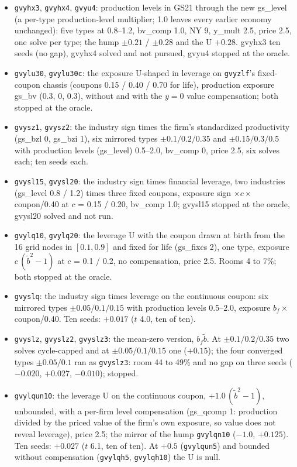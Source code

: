 \documentclass[11pt]{article}
\begin{document}
\begin{itemize}
\item \texttt{gvyhx3}, \texttt{gvyhx4}, \texttt{gvyu4}: production levels in GS21 through the new gs\_level (a per-type production-level multiplier; 1.0 leaves every earlier economy unchanged): five types at 0.8--1.2, bv\_comp 1.0, NY 9, y\_mult 2.5, price 2.5, one solve per type; the hump $\pm0.21$ / $\pm0.28$ and the U $+0.28$. gvyhx3 ten seeds (no gap), gvyhx4 solved and not pursued, gvyu4 stopped at the oracle.
\item \texttt{gvylu30}, \texttt{gvylu30c}: the exposure U-shaped in leverage on \texttt{gvyzlf}'s fixed-coupon chassis (coupons 0.15 / 0.40 / 0.70 for life), production exposure gs\_bv (0.3, 0, 0.3), without and with the $y = 0$ value compensation; both stopped at the oracle.
\item \texttt{gvysz1}, \texttt{gvysz2}: the industry sign times the firm's standardized productivity (gs\_bzl 0, gs\_bzi 1), six mirrored types $\pm0.1/0.2/0.35$ and $\pm0.15/0.3/0.5$ with production levels (gs\_level) 0.5--2.0, bv\_comp 0, price 2.5, six solves each; ten seeds each.
\item \texttt{gvysl15}, \texttt{gvysl20}: the industry sign times financial leverage, two industries (gs\_level 0.8 / 1.2) times three fixed coupons, exposure sign $\times c \times$ coupon/0.40 at $c$ = 0.15 / 0.20, bv\_comp 1.0; gvysl15 stopped at the oracle, gvysl20 solved and not run.
\item \texttt{gvylq10}, \texttt{gvylq20}: the leverage U with the coupon drawn at birth from the 16 grid nodes in $[0.1, 0.9]$ and fixed for life (gs\_fixcs 2), one type, exposure $c\,(\tilde b^2 - 1)$ at $c$ = 0.1 / 0.2, no compensation, price 2.5. Rooms 4 to 7\%; both stopped at the oracle.
\item \texttt{gvyslq}: the industry sign times leverage on the continuous coupon: six mirrored types $\pm0.05/0.1/0.15$ with production levels 0.5--2.0, exposure $b_f \times$ coupon/0.40. Ten seeds: $+0.017$ ($t$ 4.0, ten of ten).
\item \texttt{gvyslz}, \texttt{gvyslz2}, \texttt{gvyslz3}: the mean-zero version, $b_f \tilde b$. At $\pm0.1/0.2/0.35$ two solves cycle-capped and at $\pm0.05/0.1/0.15$ one ($+0.15$); the four converged types $\pm0.05/0.1$ ran as \texttt{gvyslz3}: room 44 to 49\% and no gap on three seeds ($-0.020$, $+0.027$, $-0.010$); stopped.
\item \texttt{gvylqun10}: the leverage U on the continuous coupon, $+1.0\,(\tilde b^2 - 1)$, unbounded, with a per-firm level compensation (gs\_qcomp 1: production divided by the priced value of the firm's own exposure, so value does not reveal leverage), price 2.5; the mirror of the hump \texttt{gvylqn10} ($-1.0$, $+0.125$). Ten seeds: $+0.027$ ($t$ 6.1, ten of ten). At $+0.5$ (\texttt{gvylqun5}) and bounded without compensation (\texttt{gvylqh5}, \texttt{gvylqh10}) the U is null.

\end{itemize}
\end{document}
